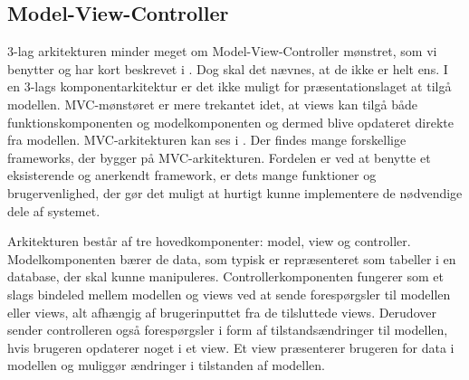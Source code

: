 \subsection{Model-View-Controller}
\label{subsec:mvc}
3-lag arkitekturen minder meget om Model-View-Controller mønstret, som vi benytter og har kort beskrevet i . Dog skal det nævnes, at de ikke er helt ens. I en 3-lags komponentarkitektur er det ikke muligt for præsentationslaget at tilgå modellen. MVC-mønstøret er mere trekantet idet, at views kan tilgå både funktionskomponenten og modelkomponenten og dermed blive opdateret direkte fra modellen\cite{designpatterns}. MVC-arkitekturen kan ses i . Der findes mange forskellige frameworks, der bygger på MVC-arkitekturen. Fordelen er ved at benytte et eksisterende og anerkendt framework, er dets mange funktioner og brugervenlighed, der gør det muligt at hurtigt kunne implementere de nødvendige dele af systemet.

Arkitekturen består af tre hovedkomponenter: model, view og controller. Modelkomponenten bærer de data, som typisk er repræsenteret som tabeller i en database, der skal kunne manipuleres. Controllerkomponenten fungerer som et slags bindeled mellem modellen og views ved at sende forespørgsler til modellen eller views, alt afhængig af brugerinputtet fra de tilsluttede views. Derudover sender controlleren også forespørgsler i form af tilstandsændringer til modellen, hvis brugeren \fx opdaterer noget i et view. Et view præsenterer brugeren for data i modellen og muliggør ændringer i tilstanden af modellen.
